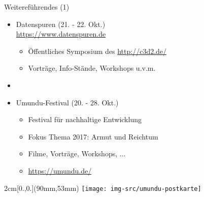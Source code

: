 \documentclass{beamer}
\begin{document}
\begin{frame}{Weitereführendes (1)}

\begin{itemize}
 \item Datenspuren (21. - 22. Okt.)\\[-6mm]
\url{https://www.datenspuren.de}
\hspace{12mm}
   \begin{itemize}
   \item Öffentliches Symposium des \href{CCC Dresden}{http://c3d2.de/}
   \item Vorträge, Info-Stände, Workshops u.v.m.

   \end{itemize}
   \item[]
   \item Umundu-Festival (20. - 28. Okt.)
   \begin{itemize}
    \item Festival für nachhaltige Entwicklung
    \item Fokus Thema 2017: Armut und Reichtum
    \item Filme, Vorträge, Workshops, ...
    \item \url{https://umundu.de/}
   \end{itemize}
\end{itemize}


\begin{textblock*}{2cm}[0.,0.](90mm,53mm)
\texttt{[image: img-src/umundu-postkarte]}
\end{textblock*}

\end{frame}
\end{document}
